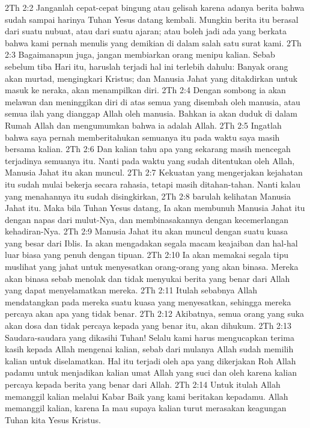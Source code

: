 2Th 2:2  Janganlah cepat-cepat bingung atau gelisah karena adanya berita bahwa sudah sampai harinya Tuhan Yesus datang kembali. Mungkin berita itu berasal dari suatu nubuat, atau dari suatu ajaran; atau boleh jadi ada yang berkata bahwa kami pernah menulis yang demikian di dalam salah satu surat kami.
2Th 2:3  Bagaimanapun juga, jangan membiarkan orang menipu kalian. Sebab sebelum tiba Hari itu, haruslah terjadi hal ini terlebih dahulu: Banyak orang akan murtad, mengingkari Kristus; dan Manusia Jahat yang ditakdirkan untuk masuk ke neraka, akan menampilkan diri.
2Th 2:4  Dengan sombong ia akan melawan dan meninggikan diri di atas semua yang disembah oleh manusia, atau semua ilah yang dianggap Allah oleh manusia. Bahkan ia akan duduk di dalam Rumah Allah dan mengumumkan bahwa ia adalah Allah.
2Th 2:5  Ingatlah bahwa saya pernah memberitahukan semuanya itu pada waktu saya masih bersama kalian.
2Th 2:6  Dan kalian tahu apa yang sekarang masih mencegah terjadinya semuanya itu. Nanti pada waktu yang sudah ditentukan oleh Allah, Manusia Jahat itu akan muncul.
2Th 2:7  Kekuatan yang mengerjakan kejahatan itu sudah mulai bekerja secara rahasia, tetapi masih ditahan-tahan. Nanti kalau yang menahannya itu sudah disingkirkan,
2Th 2:8  barulah kelihatan Manusia Jahat itu. Maka bila Tuhan Yesus datang, Ia akan membunuh Manusia Jahat itu dengan napas dari mulut-Nya, dan membinasakannya dengan kecemerlangan kehadiran-Nya.
2Th 2:9  Manusia Jahat itu akan muncul dengan suatu kuasa yang besar dari Iblis. Ia akan mengadakan segala macam keajaiban dan hal-hal luar biasa yang penuh dengan tipuan.
2Th 2:10  Ia akan memakai segala tipu muslihat yang jahat untuk menyesatkan orang-orang yang akan binasa. Mereka akan binasa sebab menolak dan tidak menyukai berita yang benar dari Allah yang dapat menyelamatkan mereka.
2Th 2:11  Itulah sebabnya Allah mendatangkan pada mereka suatu kuasa yang menyesatkan, sehingga mereka percaya akan apa yang tidak benar.
2Th 2:12  Akibatnya, semua orang yang suka akan dosa dan tidak percaya kepada yang benar itu, akan dihukum.
2Th 2:13  Saudara-saudara yang dikasihi Tuhan! Selalu kami harus mengucapkan terima kasih kepada Allah mengenai kalian, sebab dari mulanya Allah sudah memilih kalian untuk diselamatkan. Hal itu terjadi oleh apa yang dikerjakan Roh Allah padamu untuk menjadikan kalian umat Allah yang suci dan oleh karena kalian percaya kepada berita yang benar dari Allah.
2Th 2:14  Untuk itulah Allah memanggil kalian melalui Kabar Baik yang kami beritakan kepadamu. Allah memanggil kalian, karena Ia mau supaya kalian turut merasakan keagungan Tuhan kita Yesus Kristus.

